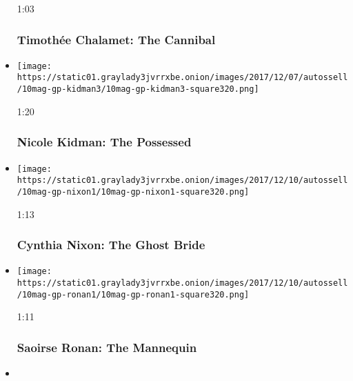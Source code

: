 \begin{itemize}
  1:03

  \hypertarget{timotheux301e-chalamet-the-cannibal}{%
  \subsubsection{Timothée Chalamet: The
  Cannibal}\label{timotheux301e-chalamet-the-cannibal}}
\item
  \href{https://www.nytimes3xbfgragh.onion/video/magazine/100000005588835/nicole-kidman-the-possessed.html?action=click\&module=video-series-bar\&region=header\&pgtype=Article\&playlistId=video/great-performers}{}

  \texttt{[image: https://static01.graylady3jvrrxbe.onion/images/2017/12/07/autossell/10mag-gp-kidman3/10mag-gp-kidman3-square320.png]}

  1:20

  \hypertarget{nicole-kidman-the-possessed}{%
  \subsubsection{Nicole Kidman: The
  Possessed}\label{nicole-kidman-the-possessed}}
\item
  \href{https://www.nytimes3xbfgragh.onion/video/magazine/100000005588895/cynthia-nixon-the-ghost-bride.html?action=click\&module=video-series-bar\&region=header\&pgtype=Article\&playlistId=video/great-performers}{}

  \texttt{[image: https://static01.graylady3jvrrxbe.onion/images/2017/12/10/autossell/10mag-gp-nixon1/10mag-gp-nixon1-square320.png]}

  1:13

  \hypertarget{cynthia-nixon-the-ghost-bride}{%
  \subsubsection{Cynthia Nixon: The Ghost
  Bride}\label{cynthia-nixon-the-ghost-bride}}
\item
  \href{https://www.nytimes3xbfgragh.onion/video/magazine/100000005588911/the-mannequin.html?action=click\&module=video-series-bar\&region=header\&pgtype=Article\&playlistId=video/great-performers}{}

  \texttt{[image: https://static01.graylady3jvrrxbe.onion/images/2017/12/10/autossell/10mag-gp-ronan1/10mag-gp-ronan1-square320.png]}

  1:11

  \hypertarget{saoirse-ronan-the-mannequin}{%
  \subsubsection{Saoirse Ronan: The
  Mannequin}\label{saoirse-ronan-the-mannequin}}
\item
  \href{https://www.nytimes3xbfgragh.onion/video/magazine/100000005588930/daniela-vega-the-vampire.html?action=click\&module=video-series-bar\&region=header\&pgtype=Article\&playlistId=video/great-performers}{}


\end{itemize}
